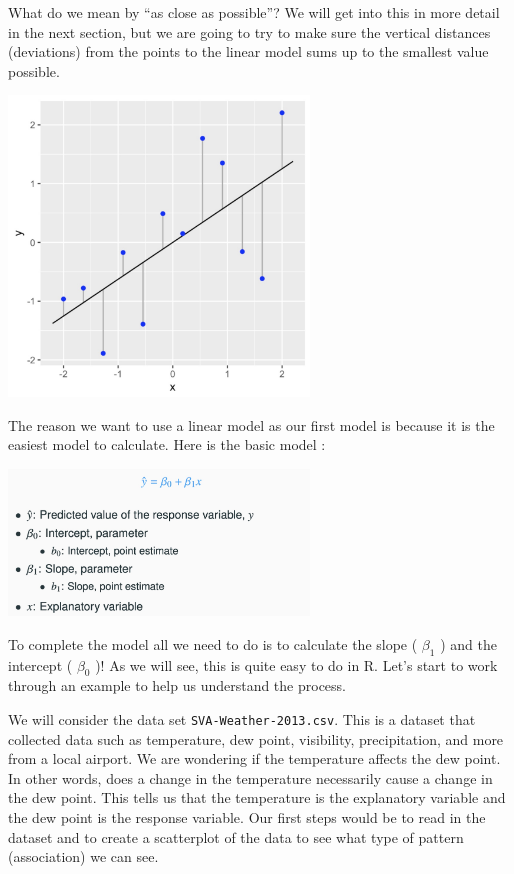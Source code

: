 \documentclass[
  letterpaper,
  DIV=11,
  numbers=noendperiod]{scrreprt}
\begin{document}
What do we mean by ``as close as possible''? We will get into this in
more detail in the next section, but we are going to try to make sure
the vertical distances (deviations) from the points to the linear model
sums up to the smallest value possible.

\includegraphics[width=0.6\textwidth,height=\textheight]{./images/LMR_2.jpg}

The reason we want to use a linear model as our first model is because
it is the easiest model to calculate. Here is the basic model :

\includegraphics[width=0.6\textwidth,height=\textheight]{./images/LMR_3.jpg}

To complete the model all we need to do is to calculate the slope (
\(\beta_1\) ) and the intercept ( \(\beta_0\) )! As we will see, this is
quite easy to do in R. Let's start to work through an example to help us
understand the process.

We will consider the data set \texttt{SVA-Weather-2013.csv}. This is a
dataset that collected data such as temperature, dew point, visibility,
precipitation, and more from a local airport. We are wondering if the
temperature affects the dew point. In other words, does a change in the
temperature necessarily cause a change in the dew point. This tells us
that the temperature is the explanatory variable and the dew point is
the response variable. Our first steps would be to read in the dataset
and to create a scatterplot of the data to see what type of pattern
(association) we can see.
\end{document}
